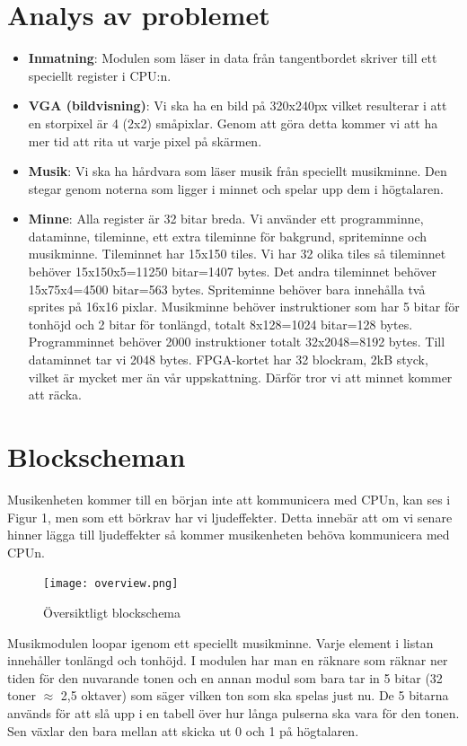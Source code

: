 \documentclass[a4paper,titlepage]{article}
\begin{document}
\section{Analys av problemet}
\begin{itemize}
	\item \textbf{Inmatning}: Modulen som läser in data från tangentbordet
		skriver till ett speciellt register i CPU:n.
	\item \textbf{VGA (bildvisning)}: Vi ska ha en bild på 320x240px vilket
		resulterar i att en storpixel är 4 (2x2) småpixlar. Genom att göra
		detta kommer vi att ha mer tid att rita ut varje pixel på skärmen. 
	\item \textbf{Musik}: Vi ska ha hårdvara som läser musik från speciellt
		musikminne. Den stegar genom noterna som ligger i minnet och spelar upp
		dem i högtalaren.
    \item \textbf{Minne}: Alla register är 32 bitar breda. Vi använder ett 
        programminne, dataminne, tileminne, ett extra tileminne för bakgrund,
        spriteminne och musikminne. Tileminnet har 15x150 tiles. Vi har 32
        olika tiles så tileminnet behöver 15x150x5=11250 bitar=1407 bytes. Det
        andra tileminnet behöver 15x75x4=4500 bitar=563 bytes. Spriteminne
        behöver bara innehålla två sprites på 16x16 pixlar. Musikminne behöver
        instruktioner som har 5 bitar för tonhöjd och 2 bitar för tonlängd,
        totalt 8x128=1024 bitar=128 bytes. Programminnet behöver 2000 
        instruktioner totalt 32x2048=8192 bytes. Till dataminnet tar vi 2048
        bytes. FPGA-kortet har 32 blockram, 2kB styck, vilket är mycket mer än
        vår uppskattning. Därför tror vi att minnet kommer att räcka.

\end{itemize}
\newpage
\section{Blockscheman}
    Musikenheten kommer till en början inte att kommunicera med CPUn, kan ses i
    Figur 1, men som ett börkrav har vi ljudeffekter. Detta 
    innebär att om vi senare hinner lägga till ljudeffekter så kommer
    musikenheten behöva kommunicera med CPUn.
\begin{figure}[h!]
	\centering
	\texttt{[image: overview.png]}
	\caption{Översiktligt blockschema}
\end{figure}

Musikmodulen loopar igenom ett speciellt musikminne. Varje element i listan
innehåller tonlängd och tonhöjd. I modulen har man en räknare som räknar ner
tiden för den nuvarande tonen och en annan modul som bara tar in 5 bitar (32
toner $\approx$ 2,5 oktaver) som säger vilken ton som ska spelas just nu. De 5
bitarna används för att slå upp i en tabell över hur långa pulserna ska vara för
den tonen. Sen växlar den bara mellan att skicka ut 0 och 1 på högtalaren.
\end{document}
